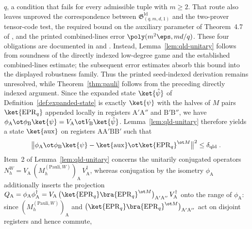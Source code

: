 \begin{remark}
	$q$, a condition that fails for every admissible tuple with $m \geq 2$.
	That route also leaves unproved the correspondence between
	$\mathfrak{G}^{\mathrm{ld}}_{(q,m,d,1)}$ and the two-prover tensor-code test,
	the required bound on the auxiliary parameter of Theorem~4.7 of
	\cite{Ji2021Quantum}, and the printed combined-lines error
	$\poly(m^2\eps,md/q)$. These four obligations are documented in
	\cite{gap:qpbt_ld-dimension-divisibility} and
	\cite{gap:qpbt_combined-lines-error-term}. Instead,
	Lemma~\ref{lem:qld-unitary} follows from soundness of the directly indexed
	low-degree game and the established combined-lines estimate; the subsequent
	error estimates absorb this bound into the displayed robustness family.
	Thus the printed seed-indexed derivation remains unresolved, while
	Theorem~\ref{thm:pauli} follows from the preceding directly indexed
	argument. Since the
	expanded state $\ket{\hat\psi}$ of Definition~\ref{def:expanded-state} is
	exactly $\ket{\psi}$ with the halves of $M$ pairs
	$\ket{\mathrm{EPR}_q}$ appended locally in registers
	$\mathrm{A}'\mathrm{A}''$ and $\mathrm{B}'\mathrm{B}''$, we have
	$\phi_{\mathrm{A}} \ot \phi_{\mathrm{B}} \ket{\psi}
	= V_{\mathrm{A}} \ot V_{\mathrm{B}} \ket{\hat\psi}$.
	Lemma~\ref{lem:qld-unitary} therefore yields a state $\ket{\mathrm{aux}}$
	on registers $\mathrm{A}\mathrm{A}'\mathrm{B}\mathrm{B}'$ such that
	\[
		\bigl\| \phi_{\mathrm{A}} \ot \phi_{\mathrm{B}} \ket{\psi} - \ket{\mathrm{aux}} \ot \ket{\mathrm{EPR}_q}^{\ot M} \bigr\|^2 \leq \delta_{\mathrm{qld}}\;.
	\]
	Item~2 of Lemma~\ref{lem:qld-unitary} concerns the unitarily conjugated operators $N^W_h = V_{\mathrm{A}} \, (M^{(\mathrm{Pauli},W)}_h)_{\mathrm{A}} \, V_{\mathrm{A}}^\dagger$, whereas conjugation by the isometry $\phi_{\mathrm{A}}$ additionally inserts the projection $Q_{\mathrm{A}} = \phi_{\mathrm{A}} \phi_{\mathrm{A}}^\dagger = V_{\mathrm{A}} \, \bigl(\ket{\mathrm{EPR}_q}\bra{\mathrm{EPR}_q}^{\ot M}\bigr)_{\mathrm{A}'\mathrm{A}''} \, V_{\mathrm{A}}^\dagger$ onto the range of $\phi_{\mathrm{A}}$: since $(M^{(\mathrm{Pauli},W)}_h)_{\mathrm{A}}$ and $\bigl(\ket{\mathrm{EPR}_q}\bra{\mathrm{EPR}_q}^{\ot M}\bigr)_{\mathrm{A}'\mathrm{A}''}$ act on disjoint registers and hence commute,

\end{remark}

